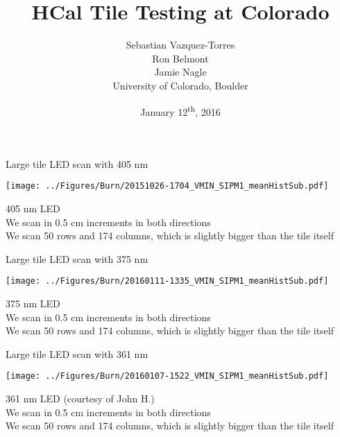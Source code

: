 \documentclass[compress,8pt]{beamer} %
\title[Jan 12, 2016 - Slide \insertframenumber]{HCal Tile Testing at Colorado}
\author[CU-Boulder]{Sebastian Vazquez-Torres \\  Ron Belmont \\ Jamie Nagle \\ \vspace{20pt} University of Colorado, Boulder}
\date{January 12\textsuperscript{th}, 2016}
\begin{document}
\begin{frame}
\titlepage
\end{frame}









\begin{frame}{Large tile LED scan with 405 nm}
\begin{adjustwidth}{-3em}{-3em}
\begin{center}
\texttt{[image: ../Figures/Burn/20151026-1704\_VMIN\_SIPM1\_meanHistSub.pdf]}
\end{center}
\end{adjustwidth}
405 nm LED \\
We scan in 0.5 cm increments in both directions \\
We scan 50 rows and 174 columns, which is slightly bigger than the tile itself
\end{frame}



\begin{frame}{Large tile LED scan with 375 nm}
\begin{adjustwidth}{-3em}{-3em}
\begin{center}
\texttt{[image: ../Figures/Burn/20160111-1335\_VMIN\_SIPM1\_meanHistSub.pdf]}
\end{center}
\end{adjustwidth}
375 nm LED \\
We scan in 0.5 cm increments in both directions \\
We scan 50 rows and 174 columns, which is slightly bigger than the tile itself
\end{frame}



\begin{frame}{Large tile LED scan with 361 nm}
\begin{adjustwidth}{-3em}{-3em}
\begin{center}
\texttt{[image: ../Figures/Burn/20160107-1522\_VMIN\_SIPM1\_meanHistSub.pdf]}
\end{center}
\end{adjustwidth}
361 nm LED (courtesy of John H.) \\
We scan in 0.5 cm increments in both directions \\
We scan 50 rows and 174 columns, which is slightly bigger than the tile itself
\end{frame}
\end{document}
